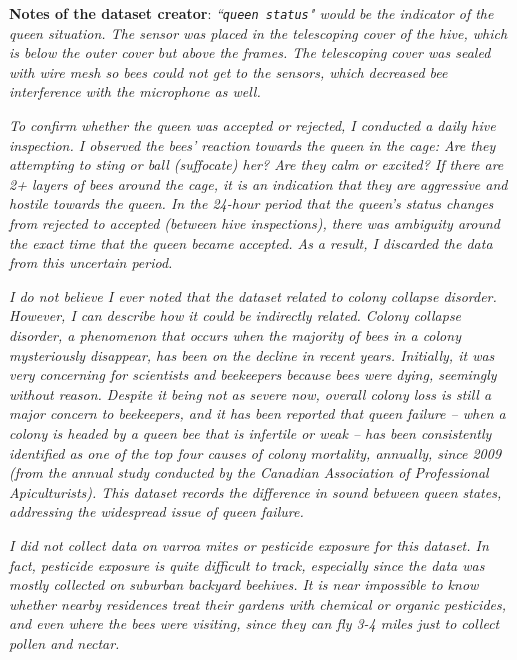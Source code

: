 \documentclass[12pt]{report}
\begin{document}
\par\textbf{Notes of the dataset creator}: \textit{``{\tt queen status}" would be the indicator of the queen situation. The sensor was placed in the telescoping cover of the hive, which is below the outer cover but above the frames. The telescoping cover was sealed with wire mesh so bees could not get to the sensors, which decreased bee interference with the microphone as well.}

\par\textit{To confirm whether the queen was accepted or rejected, I conducted a daily hive inspection. I observed the bees’ reaction towards the queen in the cage: Are they attempting to sting or ball (suffocate) her? Are they calm or excited? If there are 2+ layers of bees around the cage, it is an indication that they are aggressive and hostile towards the queen. In the 24-hour period that the queen’s status changes from rejected to accepted (between hive inspections), there was ambiguity around the exact time that the queen became accepted. As a result, I discarded the data from this uncertain period.}

\par\textit{I do not believe I ever noted that the dataset related to colony collapse disorder. However, I can describe how it could be indirectly related. Colony collapse disorder, a phenomenon that occurs when the majority of bees in a colony mysteriously disappear, has been on the decline in recent years. Initially, it was very concerning for scientists and beekeepers because bees were dying, seemingly without reason. Despite it being not as severe now, overall colony loss is still a major concern to beekeepers, and it has been reported that queen failure -- when a colony is headed by a queen bee that is infertile or weak -- has been consistently identified as one of the top four causes of colony mortality, annually, since 2009 (from the annual study conducted by the Canadian Association of Professional Apiculturists). This dataset records the difference in sound between queen states, addressing the widespread issue of queen failure.}

\par\textit{I did not collect data on varroa mites or pesticide exposure for this dataset. In fact, pesticide exposure is quite difficult to track, especially since the data was mostly collected on suburban backyard beehives. It is near impossible to know whether nearby residences treat their gardens with chemical or organic pesticides, and even where the bees were visiting, since they can fly 3-4 miles just to collect pollen and nectar.}

	\pagebreak
	\printbibliography
	\thispagestyle{empty}
	
\end{document}
